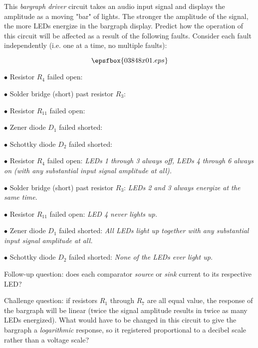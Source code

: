 

This {\it bargraph driver} circuit takes an audio input signal and displays the amplitude as a moving "bar" of lights.  The stronger the amplitude of the signal, the more LEDs energize in the bargraph display.  Predict how the operation of this circuit will be affected as a result of the following faults.  Consider each fault independently (i.e. one at a time, no multiple faults):

$$\epsfbox{03848x01.eps}$$

\medskip
\goodbreak
\item{$\bullet$} Resistor $R_4$ failed open:
\item{$\bullet$} Solder bridge (short) past resistor $R_3$:
\item{$\bullet$} Resistor $R_{11}$ failed open:
\item{$\bullet$} Zener diode $D_1$ failed shorted:
\item{$\bullet$} Schottky diode $D_2$ failed shorted:
\medskip







\medskip
\item{$\bullet$} Resistor $R_4$ failed open: {\it LEDs 1 through 3 always off, LEDs 4 through 6 always on (with any substantial input signal amplitude at all).}
\item{$\bullet$} Solder bridge (short) past resistor $R_3$: {\it LEDs 2 and 3 always energize at the same time.}
\item{$\bullet$} Resistor $R_{11}$ failed open: {\it LED 4 never lights up.}
\item{$\bullet$} Zener diode $D_1$ failed shorted: {\it All LEDs light up together with any substantial input signal amplitude at all.}
\item{$\bullet$} Schottky diode $D_2$ failed shorted: {\it None of the LEDs ever light up.}
\medskip

\vskip 10pt

Follow-up question: does each comparator {\it source} or {\it sink} current to its respective LED?

\vskip 10pt

Challenge question: if resistors $R_1$ through $R_7$ are all equal value, the response of the bargraph will be linear (twice the signal amplitude results in twice as many LEDs energized).  What would have to be changed in this circuit to give the bargraph a {\it logarithmic} response, so it registered proportional to a decibel scale rather than a voltage scale?

